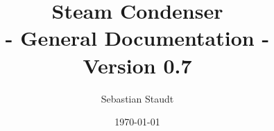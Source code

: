 \author{Sebastian Staudt}
\title{
    \huge{Steam Condenser}\\
    \small{- General Documentation -}\\
    \large{Version 0.7}
}
\date{\today}

\maketitle
